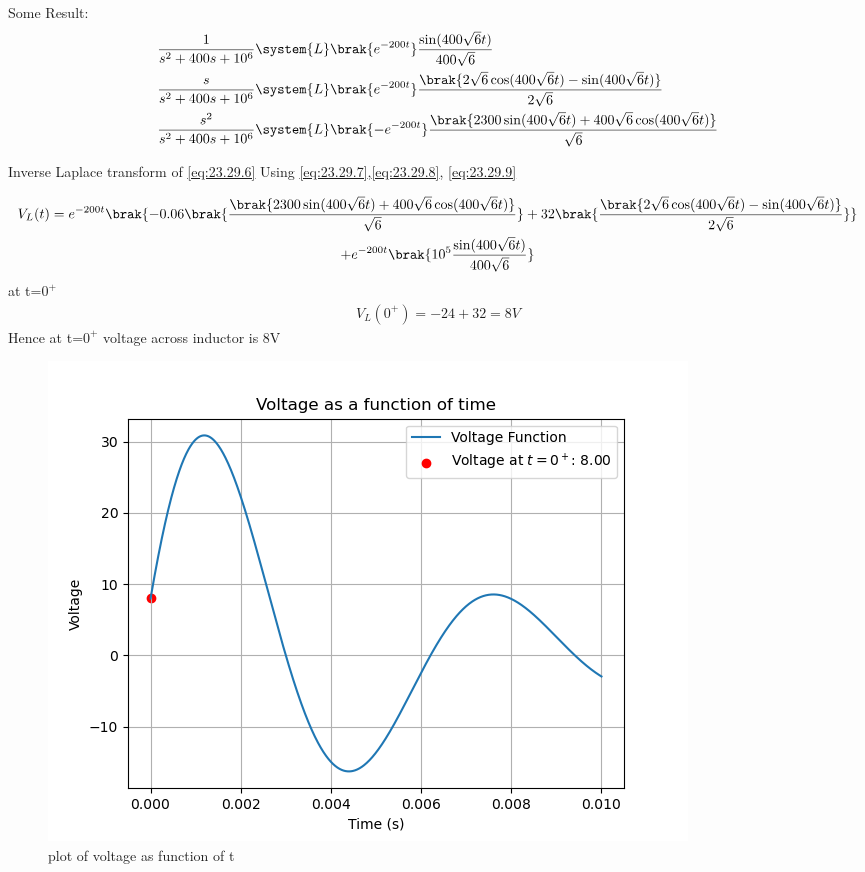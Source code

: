 \documentclass[journal,12pt,twocolumn]{IEEEtran}
\theoremstyle{remark}
\begin{document}
Some Result:
\begin{align}
\frac{1}{s^2+400s+10^6} &\system{L} \brak{e^{-200t}}\frac{\sin(400\sqrt{6}t)}{400\sqrt{6}}
   \label{eq:23.29.7}\\
\frac{s}{s^2+400s+10^6} &\system{L} \brak{e^{-200t}}\frac{\brak{2\sqrt{6}\cos(400\sqrt{6}t)-\sin(400\sqrt{6}t)}}{2\sqrt{6}}
   \label{eq:23.29.8}\\
\frac{s^2}{s^2+400s+10^6} &\system{L} \brak{-e^{-200t}}\frac{\brak{2300\sin(400\sqrt{6}t)+400\sqrt{6}\cos(400\sqrt{6}t)}}{\sqrt{6}}
   \label{eq:23.29.9}
\end{align}

Inverse Laplace transform of \eqref{eq:23.29.6} Using \eqref{eq:23.29.7},\eqref{eq:23.29.8}, \eqref{eq:23.29.9}

\begin{multline}
	V_L(t)=e^{-200t}\brak{-0.06\brak{\frac{\brak{2300\sin(400\sqrt{6}t)+400\sqrt{6}\cos(400\sqrt{6}t)}}{\sqrt{6}}}+32\brak{\frac{\brak{2\sqrt{6}\cos(400\sqrt{6}t)-\sin(400\sqrt{6}t)}}{2\sqrt{6}}}}\\+e^{-200t}\brak{10^5\frac{\sin(400\sqrt{6}t)}{400\sqrt{6}}}
\end{multline}
at t=$0^+$
\begin{align}
    V_L(0^+)= -24+32=8V
\end{align}
Hence at t=$0^+$ voltage across inductor is 8V
\begin{figure}[!h]
    \centering
    \includegraphics[width = \columnwidth]{figs/c.png}
    \caption{plot of voltage as function of t}
\end{figure}
\end{document}
